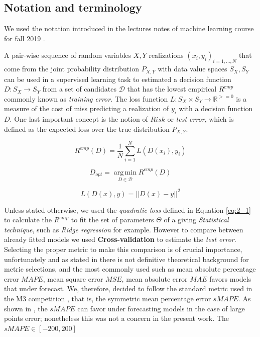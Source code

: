 \subsection{Notation and terminology}

We used the notation introduced in the lectures notes of machine learning course for fall 2019 \cite{ml_jacobs_h}. 

A pair-wise sequence of random variables $X,Y$ realizations $(x_{i},y_{i})_{i=1,...,N}$ that come from the joint probability distribution $P_{X,Y}$ with data value spaces $S_{X},S_{Y}$ can be used in a supervised learning task to estimated a decision function  $D:S_{X} \longrightarrow S_{Y}$ from a set of candidates $\mathcal{D}$ that has the lowest empirical $R^{emp}$ commonly known as \emph{training error}. The loss function $L:S_{X} \times S_{Y} \longrightarrow  \mathbb{R}^{>=0}$ is a measure of the cost of miss predicting a realization of $y_{i}$ with a decision function $D$. One last important concept is the notion of $Risk$ or \emph{test error}, which is defined as the expected loss over the true distribution $P_{X,Y}$.

\begin{equation}
R^{emp}(D)= \frac{1}{N} \sum_{i=1}^{N} L(D(x_{i}),y_{i})
\end{equation}

\begin{equation}
D_{opt}= \operatorname*{arg\,min}_{ D \in \mathcal{D} } R^{emp}(D)
\end{equation}

\begin{equation}
L(D(x),y)=||D(x)-y||^2
\label{eq:2_1}
\end{equation}

Unless stated otherwise, we used the \emph{quadratic loss} defined in Equation \ref{eq:2_1} to calculate the $R^{emp}$ to fit the set of parameters $\Theta$ of a giving \emph{Statistical technique}, such as \emph{Ridge regression} for example. However to compare between already fitted models we used \textbf{Cross-validation} to estimate the \emph{test error}. Selecting the proper metric to make this comparison is of crucial importance, unfortunately and as stated in \cite{gneiting2011making} there is not definitive theoretical background for metric selections, and the most commonly used such as mean absolute percentage error $MAPE$, mean square error $MSE$, mean absolute error $MAE$ favors models that under forecast. We, therefore, decided to follow the standard metric used in the M3 competition \cite{makridakis2000m3}, that is, the symmetric mean percentage error $sMAPE$. As shown in \cite{goshima2015estimating}, the  $sMAPE$ can favor under forecasting models in the case of large points error; nonetheless this was not a concern in the present work. The $sMAPE \in [-200,200]$ 

